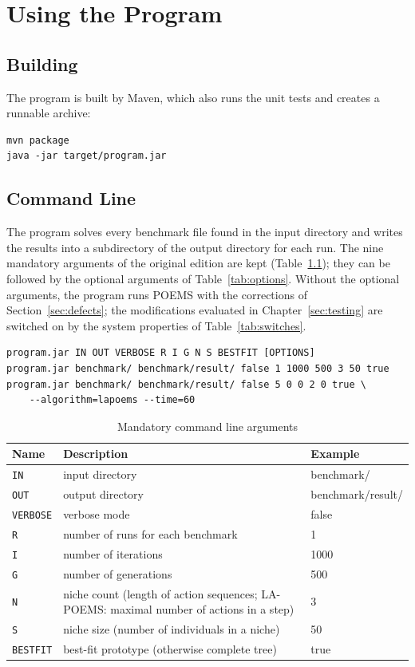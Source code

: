 \chapter{Using the Program}
\label{sec:usage}

\section{Building}

The program is built by Maven, which also runs the unit tests and creates a runnable archive:

\begin{verbatim}
mvn package
java -jar target/program.jar
\end{verbatim}

\section{Command Line}

The program solves every benchmark file found in the input directory and writes the results into a subdirectory of the output directory for each run. The nine mandatory arguments of the original edition are kept (Table~\ref{tab:args}); they can be followed by the optional arguments of Table~\ref{tab:options}. Without the optional arguments, the program runs POEMS with the corrections of Section~\ref{sec:defects}; the modifications evaluated in Chapter~\ref{sec:testing} are switched on by the system properties of Table~\ref{tab:switches}.

\begin{verbatim}
program.jar IN OUT VERBOSE R I G N S BESTFIT [OPTIONS]
program.jar benchmark/ benchmark/result/ false 1 1000 500 3 50 true
program.jar benchmark/ benchmark/result/ false 5 0 0 2 0 true \
    --algorithm=lapoems --time=60
\end{verbatim}

\begin{table}
\begin{center}
\begin{tabularx}{\textwidth}{@{}lXl@{}}
\toprule
Name & Description & Example \\
\midrule
{\tt IN} & input directory & benchmark/ \\
{\tt OUT} & output directory & benchmark/result/ \\
{\tt VERBOSE} & verbose mode & false \\
{\tt R} & number of runs for each benchmark & 1 \\
{\tt I} & number of iterations & 1000 \\
{\tt G} & number of generations & 500 \\
{\tt N} & niche count (length of action sequences; LA-POEMS: maximal number of actions in a step) & 3 \\
{\tt S} & niche size (number of individuals in a niche) & 50 \\
{\tt BESTFIT} & best-fit prototype (otherwise complete tree) & true \\
\bottomrule
\end{tabularx}
\end{center}
\caption{Mandatory command line arguments}
\label{tab:args}
\end{table}

